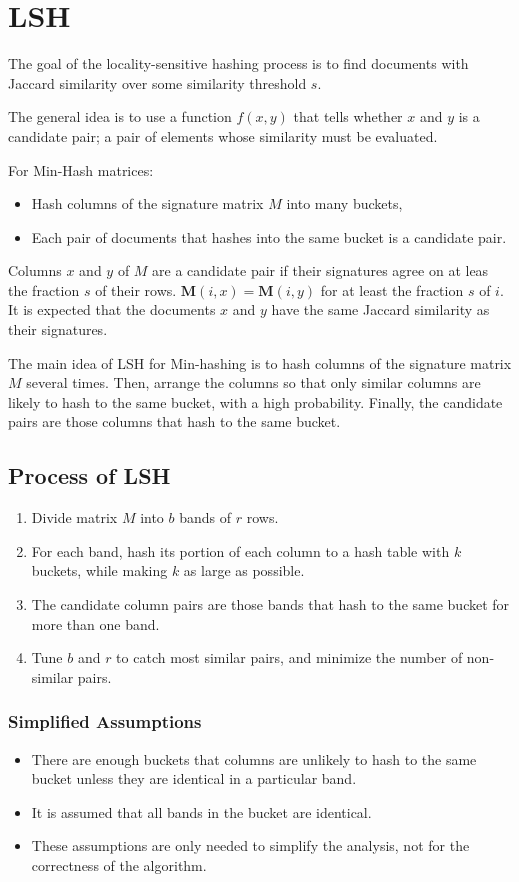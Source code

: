 \section{LSH}
The goal of the locality-sensitive hashing process is to find documents with Jaccard similarity over some similarity threshold $s$.

The general idea is to use a function $f(x, y)$ that tells whether $x$ and $y$ is a candidate pair; a pair of elements whose similarity must be evaluated.

For Min-Hash matrices:
\begin{itemize}
 \item Hash columns of the signature matrix $M$ into many buckets,
 \item Each pair of documents that hashes into the same bucket is a candidate pair.
\end{itemize}

Columns $x$ and $y$ of $M$ are a candidate pair if their signatures agree on at leas the fraction $s$ of their rows.
$\bm{M}(i, x) = \bm{M}(i, y)$ for at least the fraction $s$ of $i$. It is expected that the documents $x$ and $y$ have the same Jaccard similarity as their signatures.

\bigskip

The main idea of LSH for Min-hashing is to hash columns of the signature matrix $M$ several times.
Then, arrange the columns so that only similar columns are likely to hash to the same bucket, with a high probability.
Finally, the candidate pairs are those columns that hash to the same bucket.

\subsection{Process of LSH}
\begin{enumerate}
 \item Divide matrix $M$ into $b$ bands of $r$ rows.
 \item For each band, hash its portion of each column to a hash table with $k$ buckets, while making $k$ as large as possible.
 \item The candidate column pairs are those bands that hash to the same bucket for more than one band.
 \item Tune $b$ and $r$ to catch most similar pairs, and minimize the number of non-similar pairs.
\end{enumerate}

\subsubsection{Simplified Assumptions}
\begin{itemize}
 \item There are enough buckets that columns are unlikely to hash to the same bucket unless they are identical in a particular band.
 \item It is assumed that all bands in the bucket are identical.
 \item These assumptions are only needed to simplify the analysis, not for the correctness of the algorithm.
\end{itemize}

